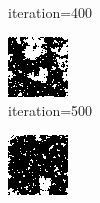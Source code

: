 \documentclass{article}
\begin{document}
\begin{figure}[h]
\begin{subfigure}[t]{0.18\textwidth}
\vspace{-0.6cm}
\caption{iteration=400}
\end{subfigure}\hspace{0.01\textwidth}
\begin{subfigure}[t]{0.18\textwidth}
\centering
\includegraphics[width=\textwidth]{./computational/results/gibbs_comb_sampler_negative_iter_500.png}
\vspace{-0.6cm}
\caption{iteration=500}
\end{subfigure}\hspace{0.01\textwidth}
\begin{subfigure}[t]{0.18\textwidth}
\centering
\includegraphics[width=\textwidth]{./computational/results/gibbs_comb_sampler_negative_iter_600.png}

\end{subfigure}
\end{figure}
\end{document}
